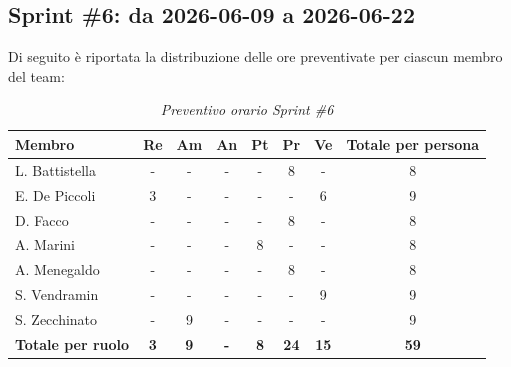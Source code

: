 \documentclass[a4paper, 10pt, colorlinks=true, linkcolor=black, urlcolor=blue, citecolor=blue, hidelinks]{article}
\renewcommand{\arraystretch}{1.2}
\begin{document}
\subsection{Sprint \#6: da 2026-06-09 a 2026-06-22}
Di seguito è riportata la distribuzione delle ore preventivate per ciascun membro del team:

\begin{table}[H]
    \centering
    \renewcommand{\arraystretch}{1.4}
    \begin{tabular}{|l|c|c|c|c|c|c|c|}
        \hline
        \rowcolor{bluBitless!15}
        \textbf{Membro} & \textbf{Re} & \textbf{Am} & \textbf{An} & \textbf{Pt} & \textbf{Pr} & \textbf{Ve} & \textbf{Totale per persona} \\
        \hline
        L. Battistella & - & - & - & - & 8 & - & 8 \\ \hline
        E. De Piccoli & 3 & - & - & - & - & 6 & 9 \\ \hline
        D. Facco & - & - & - & - & 8 & - & 8 \\ \hline
        A. Marini & - & - & - & 8 & - & - & 8 \\ \hline
        A. Menegaldo & - & - & - & - & 8 & - & 8 \\ \hline
        S. Vendramin & - & - & - & - & - & 9 & 9 \\ \hline
        S. Zecchinato & - & 9 & - & - & - & - & 9 \\ \hline
        \rowcolor{bluBitless!8}
        \textbf{Totale per ruolo} & \textbf{3} & \textbf{9} & \textbf{-} & \textbf{8} & \textbf{24} & \textbf{15} & \textbf{59} \\
        \hline
    \end{tabular}
    \caption{\textit{Preventivo orario Sprint \#6}}
\end{table}
\end{document}

